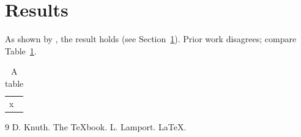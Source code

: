 \documentclass{article}
\begin{document}
\section{Results}\label{sec:res}
As shown by \cite{knuth}, the result holds (see Section~\ref{sec:res}).
Prior work \cite[p.~3]{lamport} disagrees; compare Table~\ref{tab:a}.
\begin{table}[h]
\centering
\begin{tabular}{l}
x
\end{tabular}
\caption{A table}\label{tab:a}
\end{table}
\begin{thebibliography}{9}
 D. Knuth. The TeXbook.
 L. Lamport. LaTeX.
\end{thebibliography}
\end{document}
